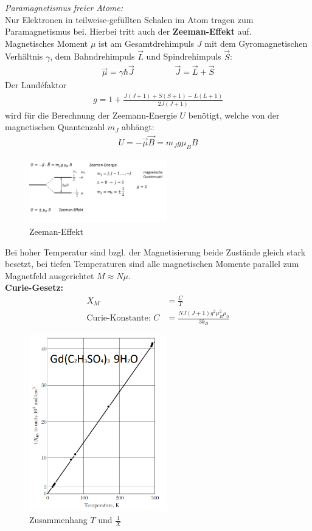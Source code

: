 \textit{Paramagnetismus freier Atome:} \\
Nur Elektronen in teilweise-gefüllten Schalen im Atom tragen zum Paramagnetismus bei. Hierbei tritt auch der \textbf{Zeeman-Effekt} auf. \\
Magnetisches Moment $\mu$ ist am Gesamtdrehimpuls $J$ mit dem Gyromagnetischen Verhältnis $\gamma$, dem Bahndrehimpuls $\vec{L}$ und Spindrehimpuls $\vec{S}$:
\begin{align}
    \Vec{\mu} = \gamma \hbar \vec{J} \hspace{2cm} \vec{J} = \vec{L} + \vec{S}
\end{align}
Der Landéfaktor 
\begin{align}
    g = 1 + \frac{J(J+1) + S(S+1) - L(L+1)}{2J(J+1)}
\end{align}
  wird für die Berechnung der Zeemann-Energie $U$ benötigt, welche von der magnetischen Quantenzahl $m_J$ abhängt:
  \begin{align}
      U = - \vec{\mu} \vec{B} = m_J g \mu_B B
  \end{align}
\begin{figure}[H]
    \centering
    \includegraphics[width=6cm]{resources/05-05-2015/Frage32_Zeeman-Effekt.PNG}
    \caption{Zeeman-Effekt}
\end{figure}

Bei hoher Temperatur sind bzgl. der Magnetisierung beide Zustände gleich stark besetzt, bei tiefen Temperaturen sind alle magnetischen Momente parallel zum Magnetfeld ausgerichtet $M \approx N \mu$. \bigskip \\

\textbf{Curie-Gesetz:}
\begin{align}
    X_M &= \frac{C}{T} \\
    \mbox{Curie-Konstante: } C &= \frac{N J (J+1) g^2 \mu_B^2 \mu_0}{3 k_B}
\end{align} \bigskip
\begin{figure}[H]
    \centering
    \includegraphics[width=6cm]{resources/05-05-2015/Frage32_Zsmhang_T_X.PNG}
    \caption{Zusammenhang $T$ und $\frac{1}{X}$}
\end{figure}


